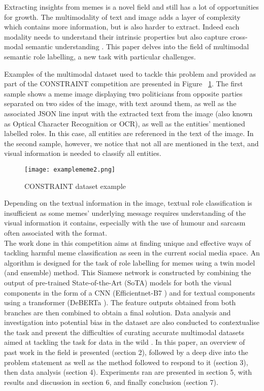 \documentclass[11pt]{article}
\begin{document}
Extracting insights from memes is a novel field and still has a lot of opportunities for growth. The multimodality of text and image adds a layer of complexity which contains more information, but is also harder to extract. Indeed each modality needs to understand their intrinsic properties but also capture cross-modal semantic understanding \cite{muller2021multimodal}. This paper delves into the field of multimodal semantic role labelling, a new task with particular challenges.

Examples of the multimodal dataset \cite{sharma2022report} used to tackle this problem and provided as part of the CONSTRAINT competition are presented in Figure ~\ref{fig:Constraint dataset examples}. The first sample shows a meme image displaying two politicians from opposite parties separated on two sides of the image, with text around them, as well as the associated JSON line input with the extracted text from the image (also known as Optical Character Recognition or OCR), as well as the entities' mentioned labelled roles. In this case, all entities are referenced in the text of the image. In the second sample, however, we notice that not all are mentioned in the text, and visual information is needed to classify all entities.
\begin{figure}
\centering
    \texttt{[image: examplememe2.png]}
    \caption{CONSTRAINT dataset example}
    \label{fig:Constraint dataset examples}
\end{figure}

Depending on the textual information in the image, textual role classification is insufficient as some memes' underlying message requires understanding of the visual information it contains, especially with the use of humour and sarcasm often associated with the format.\\
The work done in this competition aims at finding unique and effective ways of tackling harmful meme classification as seen in the current social media space. An algorithm is designed for the task of role labelling for memes using a twin model (and ensemble) method. This Siamese network is constructed by combining the output of pre-trained State-of-the-Art (SoTA) models for both the visual components in the form of a CNN (Efficientnet-B7 \cite{tan2019efficientnet}) and for textual components using a transformer (DeBERTa \cite{he2020deberta}). The feature outputs obtained from both branches are then combined to obtain a final solution. Data analysis and investigation into potential bias in the dataset are also conducted to contextualise the task and present the difficulties of curating accurate multimodal datasets aimed at tackling the task for data in the wild \cite{gao2021logically}. 
In this paper, an overview of past work in the field is presented (section 2), followed by a deep dive into the problem statement as well as the method followed to respond to it (section 3), then data analysis (section 4). Experiments ran are presented in section 5, with results and discussion in section 6, and finally conclusion (section 7).
\end{document}
